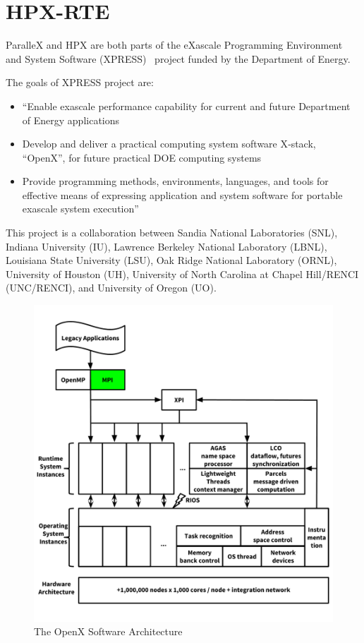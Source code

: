 \chapter{HPX-RTE}
\label{sec:HPX-RTE}

ParalleX and HPX are both parts of the eXascale Programming Environment and System Software (XPRESS)~\cite{huck2013early,brightwell2013xpress} project funded by the Department of Energy.

The goals of XPRESS project are:
\begin{itemize}
\item ``Enable exascale performance capability for current and future Department of Energy applications
\item Develop and deliver a practical computing system software X‐stack, “OpenX”, for future practical DOE computing systems
\item Provide programming methods, environments, languages, and tools for effective means of expressing application and system software for portable exascale system execution''~\cite{xpress}
\end{itemize}

This project is a collaboration between Sandia National Laboratories (SNL), Indiana University (IU), Lawrence Berkeley National Laboratory (LBNL), Louisiana State University (LSU), Oak Ridge National Laboratory (ORNL), University of Houston (UH), University of North Carolina at Chapel Hill/RENCI (UNC/RENCI), and University of Oregon (UO).


\begin{figure}[h!]
\centering
\includegraphics[scale=0.8]{images/openx.png}
\caption[The OpenX Software Architecture]{The OpenX Software Architecture}
\label{fig:openx}
\end{figure}


